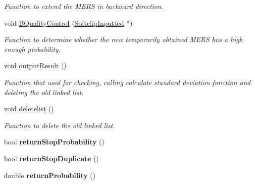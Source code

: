 \begin{DoxyCompactItemize}
\begin{DoxyCompactList}\small\item\em Function to extend the M\+E\+R\+S in backward direction. \end{DoxyCompactList}\item 
\hypertarget{class_calculation_a38224881e5f16026c39dfa0c025cef2c}{void \hyperlink{class_calculation_a38224881e5f16026c39dfa0c025cef2c}{B\+Quality\+Control} (\hyperlink{struct_softclip_inputted}{Softclip\+Inputted} $\ast$)}\label{class_calculation_a38224881e5f16026c39dfa0c025cef2c}

\begin{DoxyCompactList}\small\item\em Function to determine whether the new temporarily obtained M\+E\+R\+S has a high enough probability. \end{DoxyCompactList}\item 
\hypertarget{class_calculation_a078817b0cdb3bab580d3b6e90078bcc8}{void \hyperlink{class_calculation_a078817b0cdb3bab580d3b6e90078bcc8}{output\+Result} ()}\label{class_calculation_a078817b0cdb3bab580d3b6e90078bcc8}

\begin{DoxyCompactList}\small\item\em Function that used for checking, calling calculate standard deviation function and deleting the old linked list. \end{DoxyCompactList}\item 
\hypertarget{class_calculation_af818953bc0ddeb5538aecde5ca57e57e}{void \hyperlink{class_calculation_af818953bc0ddeb5538aecde5ca57e57e}{deletelist} ()}\label{class_calculation_af818953bc0ddeb5538aecde5ca57e57e}

\begin{DoxyCompactList}\small\item\em Function to delete the old linked list. \end{DoxyCompactList}\item 
\hypertarget{class_calculation_a3c59be764baf8013038db0e8983ede19}{bool {\bfseries return\+Stop\+Probability} ()}\label{class_calculation_a3c59be764baf8013038db0e8983ede19}

\item 
\hypertarget{class_calculation_a0c272d6f1db6b9ffa32ef2a0c96cc37f}{bool {\bfseries return\+Stop\+Duplicate} ()}\label{class_calculation_a0c272d6f1db6b9ffa32ef2a0c96cc37f}

\item 
\hypertarget{class_calculation_add58de000cc9eed14fde3dfedfe9417d}{double {\bfseries return\+Probability} ()}\label{class_calculation_add58de000cc9eed14fde3dfedfe9417d}


\end{DoxyCompactItemize}
